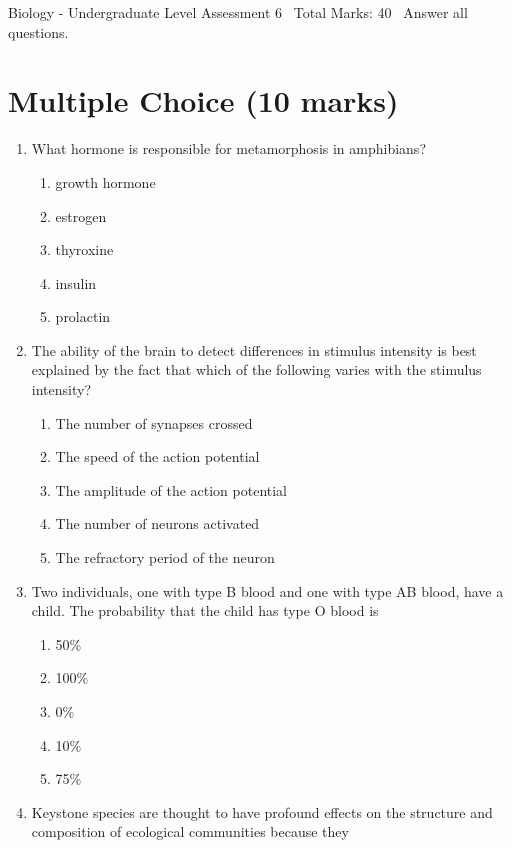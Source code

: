\documentclass[12pt]{article}
\begin{document}
\begin{center}
Biology - Undergraduate Level Assessment 6 \
Total Marks: 40 \
Answer all questions.
\end{center}

\section*{Multiple Choice (10 marks)}
\begin{enumerate}[label=\arabic*.]
\item What hormone is responsible for metamorphosis in amphibians?
\begin{enumerate}[label=(\alph*)]
    \item growth hormone
    \item estrogen
    \item thyroxine
    \item insulin
    \item prolactin
\end{enumerate}
\item The ability of the brain to detect differences in stimulus intensity is best explained by the fact that which of the following varies with the stimulus intensity?
\begin{enumerate}[label=(\alph*)]
    \item The number of synapses crossed
    \item The speed of the action potential
    \item The amplitude of the action potential
    \item The number of neurons activated
    \item The refractory period of the neuron
\end{enumerate}
\item Two individuals, one with type B blood and one with type AB blood, have a child. The probability that the child has type O blood is
\begin{enumerate}[label=(\alph*)]
    \item 50\%
    \item 100\%
    \item 0\%
    \item 10\%
    \item 75\%
\end{enumerate}
\item Keystone species are thought to have profound effects on the structure and composition of ecological communities because they
\begin{enumerate}[label=(\alph*)]

\end{enumerate}
\end{enumerate}
\end{document}
